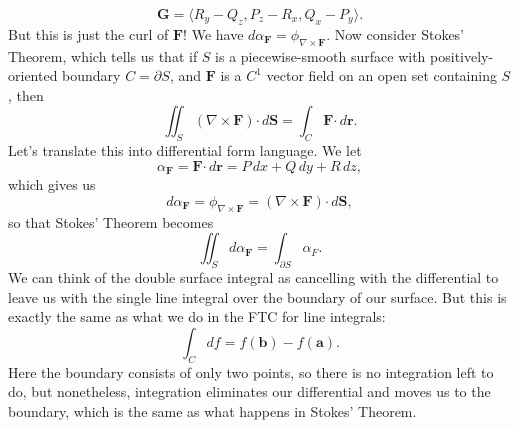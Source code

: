 \documentclass[letterpaper,12pt]{article}
\newcommand{\dotp}{\boldsymbol{\cdot}}
\renewcommand{\r}{\mathbf{r}}
\newcommand{\F}{\mathbf{F}}
\begin{document}
\[
\mathbf{G} = \langle R_y-Q_z,P_z-R_x,Q_x-P_y\rangle.
\]
But this is just the curl of $\F$! We have $d\alpha_\F = \phi_{\nabla\times\F}$. Now consider Stokes' Theorem, which tells us that if $S$ is a piecewise-smooth surface with positively-oriented boundary $C=\partial S$, and $\F$ is a $C^1$ vector field on an open set containing $S$, then
\[
\iint_S (\nabla\times \F)\dotp\,d\mathbf{S} = \int_C \F\dotp\,d\r.
\]
Let's translate this into differential form language. We let 
\[
\alpha_\F = \F\dotp\,d\r = P\,dx+Q\,dy+R\,dz,
\]
which gives us
\[
d\alpha_\F = \phi_{\nabla\times\F} = (\nabla\times\F)\dotp\,d\mathbf{S},
\]
so that Stokes' Theorem becomes
\[
\iint_S d\alpha_\F = \int_{\partial S} \alpha_F.
\]
We can think of the double surface integral as cancelling with the differential to leave us with the single line integral over the boundary of our surface. But this is exactly the same as what we do in the FTC for line integrals:
\[
\int_C df = f(\mathbf{b})-f(\mathbf{a}).
\]
Here the boundary consists of only two points, so there is no integration left to do, but nonetheless, integration eliminates our differential and moves us to the boundary, which is the same as what happens in Stokes' Theorem.
\end{document}
